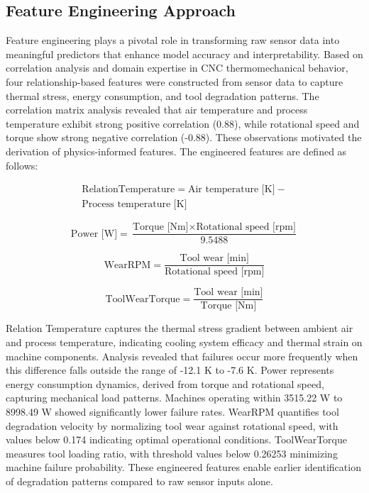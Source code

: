 \documentclass[final,5p, twocolumn]{elsarticle}
\begin{document}
\subsection{Feature Engineering Approach}
\label{sec:feature_engineering}

Feature engineering plays a pivotal role in transforming raw sensor data into meaningful predictors that enhance model accuracy and interpretability. Based on correlation analysis and domain expertise in CNC thermomechanical behavior, four relationship-based features were constructed from sensor data to capture thermal stress, energy consumption, and tool degradation patterns. The correlation matrix analysis revealed that air temperature and process temperature exhibit strong positive correlation (0.88), while rotational speed and torque show strong negative correlation (-0.88). These observations motivated the derivation of physics-informed features. The engineered features are defined as follows:

\begin{equation}
\begin{split}
 \text{RelationTemperature} = \text{Air temperature [K]} - \\  \text{Process temperature [K]}   
\end{split}
\end{equation}

\begin{equation}
\text{Power [W]} = \frac{\text{Torque [Nm]} \times \text{Rotational speed [rpm]}}{9.5488}
\end{equation}

\begin{equation}
\text{WearRPM} = \frac{\text{Tool wear [min]}}{\text{Rotational speed [rpm]}}
\end{equation}

\begin{equation}
\text{ToolWearTorque} = \frac{\text{Tool wear [min]}}{\text{Torque [Nm]}}
\end{equation}

Relation Temperature captures the thermal stress gradient between ambient air and process temperature, indicating cooling system efficacy and thermal strain on machine components. Analysis revealed that failures occur more frequently when this difference falls outside the range of -12.1 K to -7.6 K. Power represents energy consumption dynamics, derived from torque and rotational speed, capturing mechanical load patterns. Machines operating within 3515.22 W to 8998.49 W showed significantly lower failure rates. WearRPM quantifies tool degradation velocity by normalizing tool wear against rotational speed, with values below 0.174 indicating optimal operational conditions. ToolWearTorque measures tool loading ratio, with threshold values below 0.26253 minimizing machine failure probability. These engineered features enable earlier identification of degradation patterns compared to raw sensor inputs alone.
\end{document}
